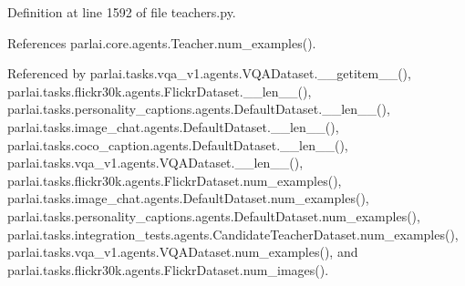 Definition at line 1592 of file teachers.\+py.



References parlai.\+core.\+agents.\+Teacher.\+num\+\_\+examples().



Referenced by parlai.\+tasks.\+vqa\+\_\+v1.\+agents.\+V\+Q\+A\+Dataset.\+\_\+\+\_\+getitem\+\_\+\+\_\+(), parlai.\+tasks.\+flickr30k.\+agents.\+Flickr\+Dataset.\+\_\+\+\_\+len\+\_\+\+\_\+(), parlai.\+tasks.\+personality\+\_\+captions.\+agents.\+Default\+Dataset.\+\_\+\+\_\+len\+\_\+\+\_\+(), parlai.\+tasks.\+image\+\_\+chat.\+agents.\+Default\+Dataset.\+\_\+\+\_\+len\+\_\+\+\_\+(), parlai.\+tasks.\+coco\+\_\+caption.\+agents.\+Default\+Dataset.\+\_\+\+\_\+len\+\_\+\+\_\+(), parlai.\+tasks.\+vqa\+\_\+v1.\+agents.\+V\+Q\+A\+Dataset.\+\_\+\+\_\+len\+\_\+\+\_\+(), parlai.\+tasks.\+flickr30k.\+agents.\+Flickr\+Dataset.\+num\+\_\+examples(), parlai.\+tasks.\+image\+\_\+chat.\+agents.\+Default\+Dataset.\+num\+\_\+examples(), parlai.\+tasks.\+personality\+\_\+captions.\+agents.\+Default\+Dataset.\+num\+\_\+examples(), parlai.\+tasks.\+integration\+\_\+tests.\+agents.\+Candidate\+Teacher\+Dataset.\+num\+\_\+examples(), parlai.\+tasks.\+vqa\+\_\+v1.\+agents.\+V\+Q\+A\+Dataset.\+num\+\_\+examples(), and parlai.\+tasks.\+flickr30k.\+agents.\+Flickr\+Dataset.\+num\+\_\+images().

